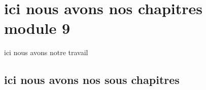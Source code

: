\chapter{ici nous avons nos chapitres module 9 }
	ici nous avons notre travail

\section{ici nous avons nos sous chapitres}
